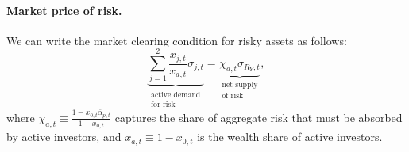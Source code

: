 \documentclass[12pt,english]{article}
\begin{document}



\paragraph{Market price of risk.} 

We can write the market clearing condition for risky assets as follows:
\begin{equation}
    \underbrace{\sum_{j=1}^2 \frac{x_{j,t}}{x_{a,t}} \sigma_{j,t}}_{\substack{\text{active demand} \\ \text{for risk}}}
    =
    \underbrace{\chi_{a,t} \sigma_{R_Y,t}}_{\substack{\text{net supply} \\ \text{of risk}}},
\end{equation}
where $\chi_{a,t} \equiv \frac{1- x_{0,t} \overline{\alpha}_{p,t}}{1-x_{0,t}}$ captures the share of aggregate risk that must be absorbed by active investors, and $x_{a,t} \equiv 1-x_{0,t}$ is the wealth share of active investors.
\end{document}
